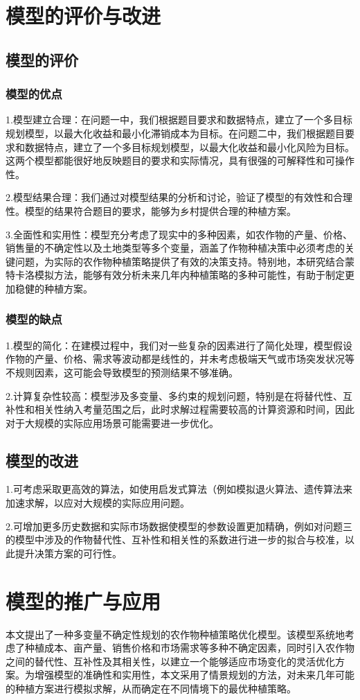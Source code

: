 \documentclass[withoutpreface]{cumcmthesis}
\begin{document}
\newpage
\section{模型的评价与改进}
\subsection{模型的评价}
\subsubsection{模型的优点}
1.模型建立合理：在问题一中，我们根据题目要求和数据特点，建立了一个多目标规划模型，以最大化收益和最小化滞销成本为目标。在问题二中，我们根据题目要求和数据特点，建立了一个多目标规划模型，以最大化收益和最小化风险为目标。这两个模型都能很好地反映题目的要求和实际情况，具有很强的可解释性和可操作性。

2.模型结果合理：我们通过对模型结果的分析和讨论，验证了模型的有效性和合理性。模型的结果符合题目的要求，能够为乡村提供合理的种植方案。

3.全面性和实用性：模型充分考虑了现实中的多种因素，如农作物的产量、价格、销售量的不确定性以及土地类型等多个变量，涵盖了作物种植决策中必须考虑的关键问题，为实际的农作物种植策略提供了有效的决策支持。特别地，本研究结合蒙特卡洛模拟方法，能够有效分析未来几年内种植策略的多种可能性，有助于制定更加稳健的种植方案。
\subsubsection{模型的缺点}
1.模型的简化：在建模过程中，我们对一些复杂的因素进行了简化处理，模型假设作物的产量、价格、需求等波动都是线性的，并未考虑极端天气或市场突发状况等不规则因素，这可能会导致模型的预测结果不够准确。

2.计算复杂性较高：模型涉及多变量、多约束的规划问题，特别是在将替代性、互补性和相关性纳入考量范围之后，此时求解过程需要较高的计算资源和时间，因此对于大规模的实际应用场景可能需要进一步优化。


\subsection{模型的改进}
1.可考虑采取更高效的算法，如使用启发式算法（例如模拟退火算法、遗传算法\cite{ref3}来加速求解，以应对大规模的实际应用问题。

2.可增加更多历史数据和实际市场数据使模型的参数设置更加精确，例如对问题三的模型中涉及的作物替代性、互补性和相关性的系数进行进一步的拟合与校准，以此提升决策方案的可行性。

\section{模型的推广与应用}
本文提出了一种多变量不确定性规划的农作物种植策略优化模型。该模型系统地考虑了种植成本、亩产量、销售价格和市场需求等多种不确定因素，同时引入农作物之间的替代性、互补性及其相关性，以建立一个能够适应市场变化的灵活优化方案。为增强模型的准确性和实用性，本文采用了情景规划的方法，对未来几年可能的种植方案进行模拟求解，从而确定在不同情境下的最优种植策略。
\end{document}
